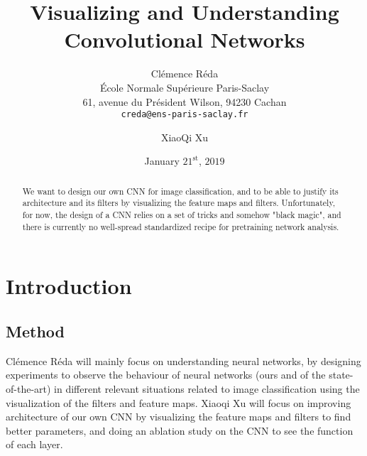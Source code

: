 \documentclass[10pt,twocolumn,letterpaper]{article}
\begin{document}
\title{Visualizing and Understanding Convolutional Networks}

\date{January $21^{\text{st}}$, $2019$}
\author{Cl\'{e}mence R\'{e}da\\
\'{E}cole Normale Sup\'{e}rieure Paris-Saclay\\
61, avenue du Pr\'{e}sident Wilson, 94230 Cachan\\
{\tt\small creda@ens-paris-saclay.fr}
\and XiaoQi Xu\\
}

\maketitle

\begin{abstract}
We want to design our own CNN for image classification, and to be able to justify its architecture and its filters by visualizing the feature maps and filters. Unfortunately, for now, the design of a CNN relies on a set of tricks and somehow "black magic", and there is currently no well-spread standardized recipe for pretraining network analysis.
\end{abstract}

\section{Introduction}


\subsection{Method}

Cl\'{e}mence R\'{e}da will mainly focus on understanding neural networks, by designing experiments to observe the behaviour of neural networks (ours and \cite{simonyan2014very} of the state-of-the-art) in different relevant situations related to image classification using the visualization of the filters and feature maps. Xiaoqi Xu will focus
on improving architecture of our own CNN by visualizing the feature maps and filters to find better parameters, and
doing an ablation study on the CNN to see the function of each layer.
\end{document}
